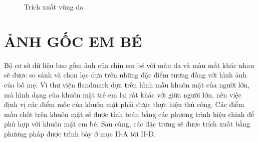 \documentclass[journal]{IEEEtran}
\begin{document}
\begin{figure}[!t]
\centering
{}
\caption{Trích xuất vùng da}
\label{refhinh8}
\end{figure}

\section{ẢNH GỐC EM BÉ}
Bộ cơ sở dữ liệu bao gồm ảnh của chín em bé với màu da và màu mắt khác nhau sẽ được so sánh và chọn lọc dựa trên những đặc điểm tương đồng với hình ảnh của bố mẹ. Vì thư viện flandmark dựa trên hình mẫu khuôn mặt của người lớn, mà hình dạng của khuôn mặt trẻ em lại rất khác với giữa người lớn, nên việc định vị các điểm mốc của khuôn mặt phải được thực hiện thủ công. Các điểm mấu chốt trên khuôn mặt sẽ được tính toán bằng các phương trình hiệu chỉnh để phù hợp với khuôn mặt em bé. Sau cùng, các đặc trưng sẽ được trích xuất bằng phương pháp được trình bày ở mục II-A tới II-D. 
\end{document}
